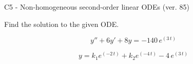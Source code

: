 \begin{exercise}
  \begin{exerciseTitle}C5 - Non-homogeneous second-order linear ODEs (ver. 85)\end{exerciseTitle}
  \begin{exerciseStatement}
    
Find the solution to the given ODE.

    
\[y''+6y'+8y = -140 \, e^{\left(3 \, t\right)}\]

  \end{exerciseStatement}
  \begin{exerciseAnswer}
    
\[y= k_{1} e^{\left(-2 \, t\right)} + k_{2} e^{\left(-4 \, t\right)} - 4 \, e^{\left(3 \, t\right)}\]

  \end{exerciseAnswer}
\end{exercise}